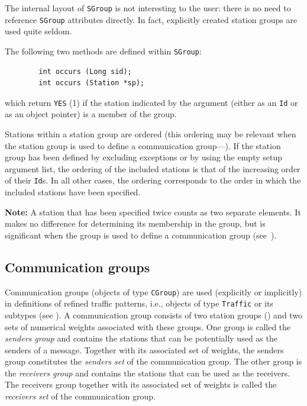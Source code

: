 The internal layout of {\tt SGroup} is not interesting to the user: there
is no need to reference {\tt SGroup} attributes directly.
In fact, explicitly created station groups are used quite seldom.

The following two methods are defined within {\tt SGroup}:
\begin{verbatim}
        int occurs (Long sid);
        int occurs (Station *sp);
\end{verbatim}
which return {\tt YES} (1) if the station indicated by the argument (either
as an {\tt Id} or as an object pointer) is a member of the group.

Stations within a station group are ordered (this ordering may be relevant when
the station group is used to define a communication group---).
If the station group has been defined by excluding exceptions or by using
the empty setup argument list, the ordering
of the included stations is that of the increasing order of their
{\tt Id}s.
In all other cases, the ordering corresponds to the order in which the
included stations have been specified.

\medskip

\noindent
{\bf Note:} A station that has been specified
twice counts as two separate elements.
It makes no difference for determining its membership in the
group, but is significant when the group is used to define a
communication group (see~).

\subsection{Communication groups}
\label{rm_cl_cg}

Communication groups (objects of type {\tt CGroup})
are used (explicitly or implicitly)
in definitions of refined traffic patterns, i.e.,
objects of type {\tt Traffic} or its subtypes (see ).
A communication group consists of two station groups ()
and two sets of numerical weights associated with these groups.
One group is called the {\em senders group\/} and contains the stations that
can be potentially used as the senders of a message.
Together with its associated set of weights, the senders group constitutes
the {\em senders set\/} of the communication group.
The other group is the {\em receivers group\/} and contains the stations that
can be used as the receivers.
The receivers group together with its associated set of weights is called
the {\em receivers set\/} of the communication group.


